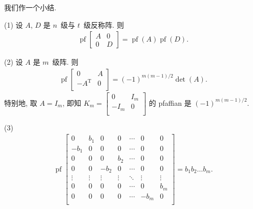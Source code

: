 \documentclass[../libro.tex]{subfiles}
\begin{document}
我们作一个小结.

\begin{theorem}
    (1)
    设 \(A\), \(D\) 是 \(n\)~级与 \(t\)~级反称阵.
    则
    \begin{align*}
        \operatorname{pf} {
            \begin{bmatrix}
                A & 0 \\
                0 & D
            \end{bmatrix}
        }
        = \operatorname{pf} {(A)} \operatorname{pf} {(D)}.
    \end{align*}

    (2)
    设 \(A\) 是 \(m\)~级阵.
    则
    \begin{align*}
        \operatorname{pf} {
            \begin{bmatrix}
                0               & A \\
                -A^{\mathrm{T}} & 0 \\
            \end{bmatrix}
        } = (-1)^{m(m-1)/2} \det {(A)}.
    \end{align*}
    特别地, 取 \(A = I_m\), 即知
    \(K_m =
        \begin{bmatrix}
            0    & I_m \\
            -I_m & 0   \\
    \end{bmatrix}\)
    的 pfaffian 是 \((-1)^{m(m-1)/2}\).

    (3)
    \begin{align*}
        \operatorname{pf} {
            \begin{bmatrix}
                0      & b_1    & 0      & 0      & \cdots & 0      & 0      \\
                -b_1   & 0      & 0      & 0      & \cdots & 0      & 0      \\
                0      & 0      & 0      & b_2    & \cdots & 0      & 0      \\
                0      & 0      & -b_2   & 0      & \cdots & 0      & 0      \\
                \vdots & \vdots & \vdots & \vdots & \ddots & \vdots & \vdots \\
                0      & 0      & 0      & 0      & \cdots & 0      & b_m    \\
                0      & 0      & 0      & 0      & \cdots & -b_m   & 0      \\
            \end{bmatrix}
        } = b_1 b_2 \dots b_m.
    \end{align*}
\end{theorem}
\end{document}
